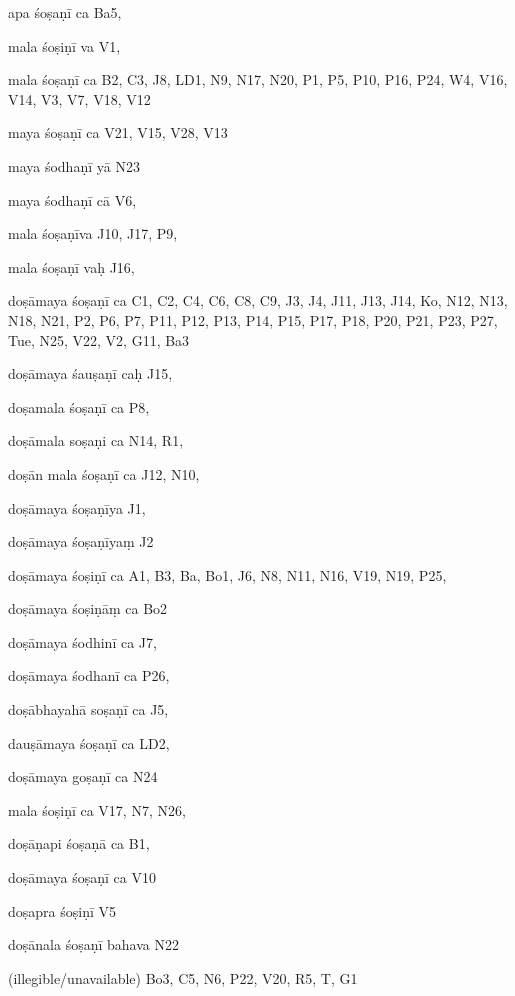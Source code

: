 \begin{ekdosis}
\begin{marma}[hp01_055]
\begin{marma}[hp02_009]
\begin{marma}[hp02_011]
 \begin{marma}[hp02_35c]
\item[apa śoṣaṇī ca] Ba5,
\item[mala śoṣiṇī va] V1,
\item[mala śoṣaṇī ca] B2, C3, J8, LD1, N9, N17, N20, P1, P5, P10, P16, P24, W4, V16, V14, V3, V7, V18, V12
\item[maya śoṣaṇī ca] V21, V15, V28, V13
\item[maya śodhaṇī yā] N23
\item[maya śodhaṇī cā] V6, 
\item[mala śoṣaṇīva] J10, J17, P9,
\item[mala śoṣaṇī vaḥ] J16,
\item[doṣāmaya śoṣaṇī ca] C1, C2, C4, C6, C8, C9, J3, J4, J11, J13, J14, Ko, N12, N13, N18, N21, P2, P6, P7, P11, P12, P13, P14, P15, P17, P18, P20, P21, P23, P27, Tue, N25, V22, V2, G11, Ba3
\item[doṣāmaya śauṣaṇī caḥ] J15, 
\item[doṣamala śoṣaṇī ca] P8,  
\item[doṣāmala soṣaṇi ca] N14, R1,  
\item[doṣān mala śoṣaṇī ca] J12, N10, 
\item[doṣāmaya śoṣaṇīya] J1,
\item[doṣāmaya śoṣaṇīyaṃ] J2
\item[doṣāmaya śoṣiṇī ca] A1, B3, Ba, Bo1, J6, N8, N11, N16, V19, N19, P25, 
\item[doṣāmaya śoṣiṇāṃ ca] Bo2
\item[doṣāmaya śodhinī ca] J7, 
\item[doṣāmaya śodhanī ca] P26,
\item[doṣābhayahā soṣaṇī ca] J5,
\item[dauṣāmaya śoṣaṇī ca] LD2,
\item[doṣāmaya goṣaṇī ca] N24
\item[mala śoṣiṇī ca] V17, N7, N26,
\item[doṣāṇapi śoṣaṇā ca] B1,
\item[doṣāmaya śoṣaṇī ca] V10
\item[doṣapra śoṣiṇī] V5
\item[doṣānala śoṣaṇī bahava] N22
\item[(illegible/unavailable)] Bo3, C5, N6, P22, V20, R5, T, G1
  \begin{description}

    \end{description}
 \end{marma}


\end{marma}
\end{marma}
\end{marma}
\end{ekdosis}
